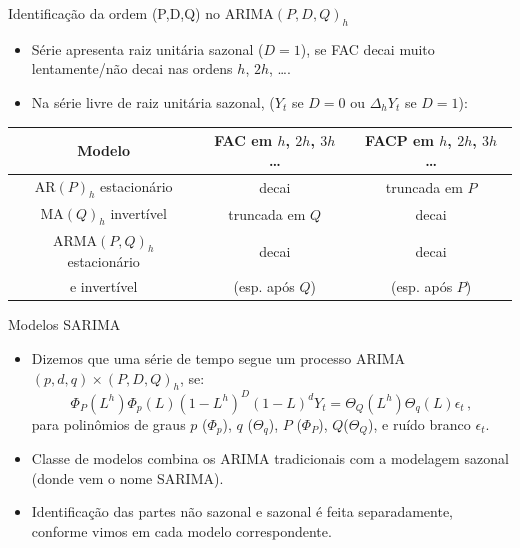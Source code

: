 \documentclass[11pt]{beamer}
\begin{document}
\begin{frame}{Identificação da ordem (P,D,Q) no $\text{ARIMA}(P,D,Q)_h$}
\begin{itemize}
	\item Série apresenta raiz unitária sazonal ($D=1$), se FAC decai muito lentamente/não decai nas ordens $h$, $2h$, \ldots.
	
	\item Na série livre de raiz unitária sazonal, ($Y_t$ se $D=0$ ou $\Delta_h Y_t$ se $D=1$):
\end{itemize}
	\begin{table}[H]
	\begin{center}
		\begin{tabular}{c|c|c}
	Modelo& FAC em $h$, $2h$, $3h$ \ldots  & FACP em $h$, $2h$, $3h$ \ldots   \\
	\hline
	$\text{AR}(P)_h$ estacionário& decai  & truncada em $P$  \\
	\hline
	$\text{MA}(Q)_h$ invertível& truncada em $Q$ & decai   \\
	\hline
	$\text{ARMA}(P,Q)_h$ estacionário  & decai  & decai  \\
	e invertível& (esp. após $Q$) & (esp. após $P$)
\end{tabular}
\end{center}
\end{table}
\end{frame}
\begin{frame}{Modelos SARIMA}
	\begin{itemize}
		\item Dizemos que uma série de tempo segue um processo ARIMA$(p,d,q)\times (P,D,Q)_h$, se:
		$$ \Phi_P(L^h) \Phi_p(L) (1-L^h)^{D}(1-L)^{d}Y_t = \Theta_Q(L^h) \Theta_q(L) \epsilon_t\, ,$$
		para polinômios de graus  $p$ ($\Phi_p$), $q$ ($\Theta_q$), $P$ ($\Phi_P$), $Q$($\Theta_Q$), e ruído branco $\epsilon_t$.
		\item Classe de modelos combina os ARIMA tradicionais com a modelagem sazonal (donde vem o nome SARIMA).
		\item Identificação das partes não sazonal e sazonal é feita separadamente, conforme vimos em cada modelo correspondente.
	\end{itemize}
\end{frame}
\end{document}

